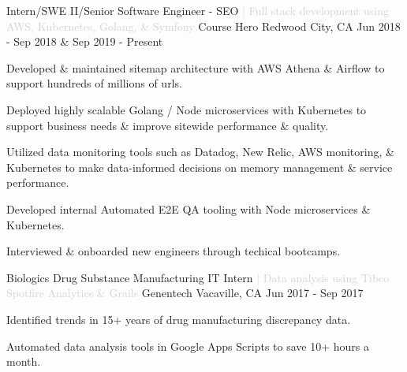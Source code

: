 

\begin{cventries}

  \cventry
  {Intern/SWE II/Senior Software Engineer - SEO \textcolor{lightgray}{| Full stack development using AWS, Kubernetes, Golang, \& Symfony }}
  {Course Hero}
  {Redwood City, CA}
  {Jun 2018 - Sep 2018 \& Sep 2019 - Present}
  {
  \begin{cvitems}
    \item {Developed \& maintained sitemap architecture with AWS Athena \& Airflow to support hundreds of millions of urls.}
    \item {Deployed highly scalable Golang / Node microservices with Kubernetes to support business needs \& improve sitewide performance \& quality.}
    \item {Utilized data monitoring tools such as Datadog, New Relic, AWS monitoring, \& Kubernetes to make data-informed decisions on memory management \& service performance.}
    \item {Developed internal Automated E2E QA tooling with Node microservices \& Kubernetes.}
    \item {Interviewed \& onboarded new engineers through techical bootcamps.}
  \end{cvitems}
  }

  \cventry
  {Biologics Drug Substance Manufacturing IT Intern \textcolor{lightgray}{| Data analysis using Tibco Spotfire Analytics \& Grails} } %
  {Genentech} %
  {Vacaville, CA} %
  {Jun 2017 - Sep 2017} %
  {
  \begin{cvitems} %
    \item {Identified trends in 15+ years of drug manufacturing discrepancy data.}
    \item {Automated data analysis tools in Google Apps Scripts to save 10+ hours a month.}
  \end{cvitems}
  }
\end{cventries}
